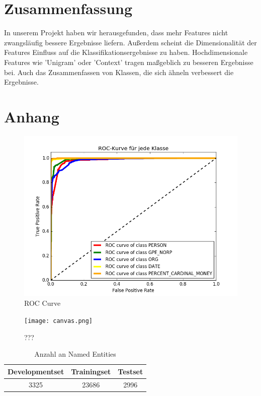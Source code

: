 \documentclass[a4paper, 11pt]{article}
\begin{document}
\section{Zusammenfassung}
In unserem Projekt haben wir herausgefunden, dass mehr Features nicht zwangsläufig bessere Ergebnisse liefern. Außerdem scheint die Dimensionalität der Features Einfluss auf die Klassifikationsergebnisse zu haben. Hochdimensionale Features wie 'Unigram' oder 'Context' tragen maßgeblich zu besseren Ergebnisse bei. Auch das Zusammenfassen von Klassen, die sich ähneln verbessert die Ergebnisse.
\newpage
\section{Anhang}
\begin{figure}
	\includegraphics[scale=0.5]{roc_curve.png}
	\caption{ROC Curve}
	\label{img:roccurve}
\end{figure}
\begin{figure}
	\texttt{[image: canvas.png]}
	\caption{???}
	\label{img:canvas}
\end{figure}
\begin{table}
			 	\begin{tabular}{ccc}
			 		\toprule
					Developmentset & Trainingset & Testset\\
			 		\midrule
					3325 & 23686 & 2996\\
			 		\bottomrule
			 	\end{tabular}
			 	\caption{Anzahl an  Named Entities}
			 	\label{tab:datasets}
\end{table}
\end{document}
